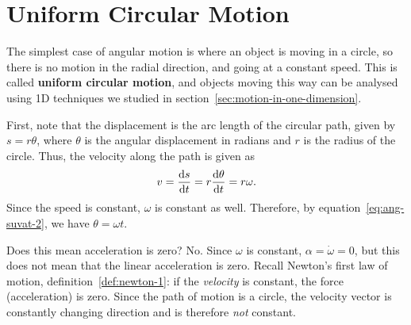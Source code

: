 \documentclass[../classical_mechanics.tex]{subfiles}
\begin{document}
    \section{Uniform Circular Motion}\label{sec:uniform-circular-motion}
        The simplest case of angular motion is where an object is moving in a circle, so there is no motion in the radial direction, and going at a constant speed.
        This is called \textbf{uniform circular motion}, and objects moving this way can be analysed using 1D techniques we studied in section~\ref{sec:motion-in-one-dimension}.
        \begin{figure}[H]
            \centering
        \end{figure}
        First, note that the displacement is the arc length of the circular path, given by $s=r\theta$, where $\theta$ is the angular displacement in radians and $r$ is the radius of the circle.
        Thus, the velocity along the path is given as
        \begin{equation}\label{eq:ucm-speed}
            v=\dv{s}{t}=r\dv{\theta}{t}=r\omega.
        \end{equation}
        Since the speed is constant, $\omega$ is constant as well.
        Therefore, by equation~\ref{eq:ang-suvat-2}, we have $\theta=\omega t$.

        Does this mean acceleration is zero?
        No.
        Since $\omega$ is constant, $\alpha=\dot{\omega}=0$, but this does not mean that the linear acceleration is zero.
        Recall Newton's first law of motion, definition~\ref{def:newton-1}: if the \textit{velocity} is constant, the force (acceleration) is zero.
        Since the path of motion is a circle, the velocity vector is constantly changing direction and is therefore \textit{not} constant.
\end{document}
